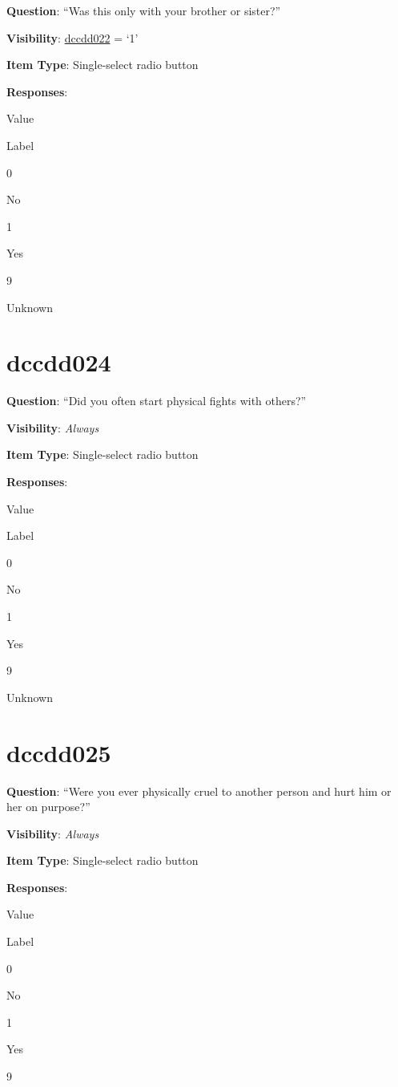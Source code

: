 \documentclass[]{book}
\begin{document}
\textbf{Question}: ``Was this only with your brother or sister?''

\textbf{Visibility}: \protect\hyperlink{dccdd022}{dccdd022} = `1'

\textbf{Item Type}: Single-select radio button

\textbf{Responses}:

Value

Label

0

No

1

Yes

9

Unknown

\hypertarget{dccdd024}{%
\section{dccdd024}\label{dccdd024}}

\textbf{Question}: ``Did you often start physical fights with others?''

\textbf{Visibility}: \emph{Always}

\textbf{Item Type}: Single-select radio button

\textbf{Responses}:

Value

Label

0

No

1

Yes

9

Unknown

\hypertarget{dccdd025}{%
\section{dccdd025}\label{dccdd025}}

\textbf{Question}: ``Were you ever physically cruel to another person and hurt him or her on purpose?''

\textbf{Visibility}: \emph{Always}

\textbf{Item Type}: Single-select radio button

\textbf{Responses}:

Value

Label

0

No

1

Yes

9
\end{document}
